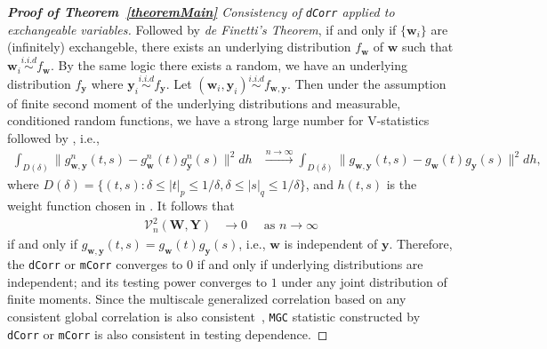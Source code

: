 \documentclass[11pt]{article}
\theoremstyle{definition}
\begin{document}
\begin{proof}[\textbf{Proof of Theorem~\ref{theoremMain}} Consistency of \texttt{dCorr} applied to exchangeable variables]
Followed by \textit{de Finetti's Theorem}, if and only if $\{ \mathbf{w}_{i} \}$ are (infinitely) exchangeble, there exists an underlying distribution $f_{\mathbf{w}}$ of $\mathbf{w}$ such that $\mathbf{w}_{i}  \overset{i.i.d}{\sim} f_{\mathbf{w}} $. By the same logic there exists a random, we have an underlying distribution $f_{\mathbf{y}}$ where $\mathbf{y}_{i} \overset{i.i.d}{\sim} f_{\mathbf{y}}$. Let $(\mathbf{w}_{i}, \mathbf{y}_{i}) \overset{i.i.d}{\sim}   f_{\mathbf{w}, \mathbf{y}}$. Then under the assumption of finite second moment of the underlying distributions and measurable, conditioned random functions, we have a strong large number for V-statistics followed by \cite{szekely2007measuring}, i.e., 
\begin{eqnarray}
\displaystyle\int_{D(\delta)}{\|g_{\mathbf{w},\mathbf{y}}^{n}(t,s)-g_{\mathbf{w}}^{n}(t)g_{\mathbf{y}}^{n}(s)\|^{2}}dh &\stackrel{n \rightarrow \infty}{\longrightarrow} 
\displaystyle\int_{D(\delta)}{\|g_{\mathbf{w},\mathbf{y}}(t,s)-g_{\mathbf{w}}(t)g_{\mathbf{y}}(s)\|^{2}}dh,
\label{eq:SLLN}
\end{eqnarray}
where $D(\delta)=\{(t,s):\delta \leq |t|_{p} \leq 1/\delta,\delta \leq |s|_{q} \leq 1/\delta\}$, and $h(t,s)$ is the weight function chosen in \cite{szekely2007measuring}. 	
It follows that 
\begin{eqnarray}
\mathcal{V}_{n}^{2}(\mathbf{W},\mathbf{Y}) &\rightarrow 0 \quad \mbox{ as } n \rightarrow \infty
\label{eq:conv2}
\end{eqnarray}
if and only if $g_{\mathbf{w},\mathbf{y}}(t,s) = g_{\mathbf{w}}(t) g_{\mathbf{y}}(s)$, i.e., $\mathbf{w}$ is independent of $\mathbf{y}$. Therefore, the \texttt{dCorr} or \texttt{mCorr} converges to $0$ if and only if  underlying distributions are independent; and its testing power converges to $1$ under any joint distribution of finite moments. Since the multiscale generalized correlation based on any consistent global correlation is also consistent~\citep{shen2016discovering}, \texttt{MGC} statistic constructed by \texttt{dCorr} or \texttt{mCorr} is also consistent in testing dependence.
\end{proof}
	
\end{document}
